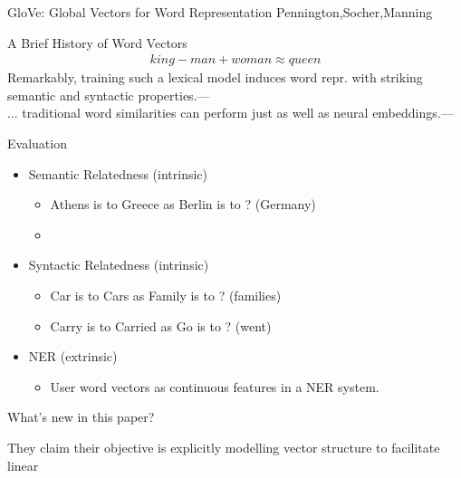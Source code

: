 \begin{frame}
  \begin{center}
    {\huge GloVe: Global Vectors for Word Representation
    }
    Pennington,Socher,Manning
  \end{center}
\end{frame}

\begin{frame}{A Brief History of Word Vectors}
  \begin{align*}
    king - man + woman \approx queen
  \end{align*}  
  \footnotesize{Remarkably, training such a lexical model induces word repr. with striking semantic and syntactic properties.}---\cite{Mikolov13a} \\
  \footnotesize{... traditional word similarities can perform just as well as neural embeddings.}---\cite{Levy14}
\end{frame}

\begin{frame}{Evaluation}
  \begin{itemize}
  \item Semantic Relatedness (intrinsic)
    \begin{itemize}
    \item Athens is to Greece as Berlin is to ? (Germany)
    \item 
    \end{itemize}
  \item Syntactic Relatedness (intrinsic)
    \begin{itemize}
    \item Car is to Cars as Family is to ? (families)
    \item Carry is to Carried as Go is to ? (went)
    \end{itemize}
  \item NER (extrinsic)
    \begin{itemize}
    \item User word vectors as continuous features in a NER system.
    \end{itemize}
  \end{itemize}
\end{frame}

\begin{frame}{What's new in this paper?}
\item They claim their objective is explicitly modelling vector structure to facilitate linear 
\end{frame}
